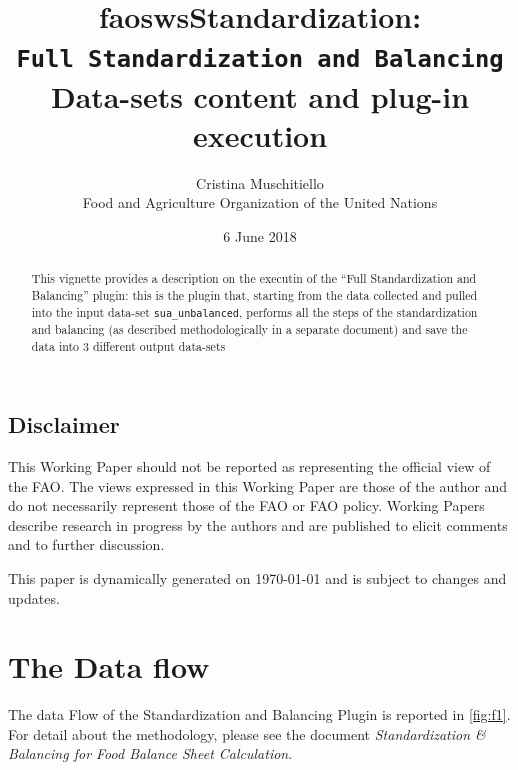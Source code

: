 \documentclass[]{article}
\title{faoswsStandardization:\\
\texttt{Full\ Standardization\ and\ Balancing}\\
Data-sets content and plug-in execution}
\author{Cristina Muschitiello\\
Food and Agriculture Organization of the United Nations}
\date{6 June 2018}
\begin{document}
\maketitle
\begin{abstract}
This vignette provides a description on the executin of the ``Full
Standardization and Balancing'' plugin: this is the plugin that,
starting from the data collected and pulled into the input data-set
\texttt{sua\_unbalanced}, performs all the steps of the standardization
and balancing (as described methodologically in a separate document) and
save the data into 3 different output data-sets
\end{abstract}

{
\setcounter{tocdepth}{4}
\tableofcontents
}
\listoffigures

\subsection*{Disclaimer}\label{disclaimer}

This Working Paper should not be reported as representing the official
view of the FAO. The views expressed in this Working Paper are those of
the author and do not necessarily represent those of the FAO or FAO
policy. Working Papers describe research in progress by the authors and
are published to elicit comments and to further discussion.

This paper is dynamically generated on \today{} and is subject to
changes and updates.

\newpage

\section*{The Data flow}\label{the-data-flow}

The data Flow of the Standardization and Balancing Plugin is reported in
\ref{fig:f1}. For detail about the methodology, please see the document
\emph{Standardization \& Balancing for Food Balance Sheet Calculation}.
\end{document}
